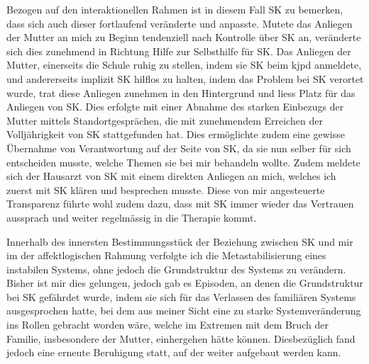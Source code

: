 Bezogen auf den interaktionellen Rahmen ist in diesem Fall SK zu bemerken, dass sich auch dieser fortlaufend veränderte und anpasste. Mutete das Anliegen der Mutter an mich zu Beginn tendenziell nach Kontrolle über SK an, veränderte sich dies zunehmend in Richtung Hilfe zur Selbsthilfe für SK. Das Anliegen der Mutter, einerseits die Schule ruhig zu stellen, indem sie SK beim \ac{kjpd} anmeldete, und andererseits implizit SK hilflos zu halten, indem das Problem bei SK verortet wurde, trat diese Anliegen zunehmen in den Hintergrund und liess Platz für das Anliegen von SK. Dies erfolgte mit einer Abnahme des starken Einbezugs der Mutter mittels Standortgesprächen, die mit zunehmendem Erreichen der Volljährigkeit von SK stattgefunden hat. Dies ermöglichte zudem eine gewisse Übernahme von Verantwortung auf der Seite von SK, da sie nun selber für sich entscheiden musste, welche Themen sie bei mir behandeln wollte. Zudem meldete sich der Hausarzt von SK mit einem direkten Anliegen an mich, welches ich zuerst mit SK klären und besprechen musste. Diese von mir angesteuerte Transparenz führte wohl zudem dazu, dass mit SK immer wieder das Vertrauen aussprach und weiter regelmässig in die Therapie kommt. 

Innerhalb des innersten Bestimmungsstück der Beziehung zwischen SK und mir im der affektlogischen Rahmung verfolgte ich die Metastabilisierung eines instabilen Systems, ohne jedoch die Grundstruktur des Systems zu verändern. Bisher ist mir dies gelungen, jedoch gab es Episoden, an denen die Grundstruktur bei SK gefährdet wurde, indem sie sich für das Verlassen des familiären Systems ausgesprochen hatte, bei dem aus meiner Sicht eine zu starke Systemveränderung ins Rollen gebracht worden wäre, welche im Extremen mit dem Bruch der Familie, insbesondere der Mutter, einhergehen hätte können. Diesbezüglich fand jedoch eine erneute Beruhigung statt, auf der weiter aufgebaut werden kann. 

